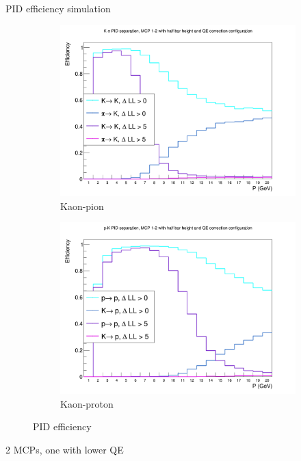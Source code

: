 \documentclass{beamer}
\begin{document}
\begin{frame}{PID efficiency simulation}
  \begin{figure}
    \centering
    \vspace{-0.2cm}
    \begin{subfigure}{0.5\textwidth}
      \includegraphics[width = 1.0\textwidth]{Plots/KaonPionPIDEfficiencyStandardMCPAB.png}
      \caption{Kaon-pion}
    \end{subfigure}%
    \begin{subfigure}{0.5\textwidth}
      \includegraphics[width = 1.0\textwidth]{Plots/PionProtonPIDEfficiencyStandardMCPAB.png}
      \caption{Kaon-proton}
    \end{subfigure}
    \caption{PID efficiency}
  \end{figure}
  \begin{center}
    2 MCPs, one with lower QE
  \end{center}
\end{frame}
\end{document}
